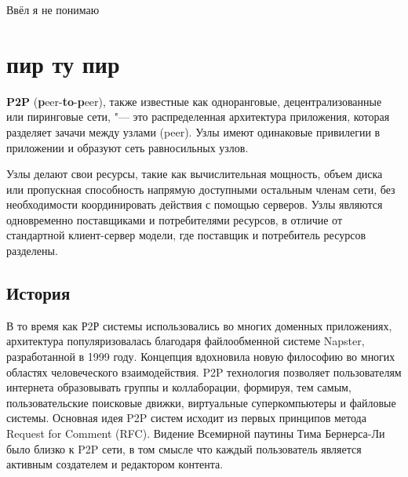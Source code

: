 \documentclass[bachelor, och, coursework]{SCWorks}
\begin{document}




\tableofcontents

\intro
Ввёл я не понимаю 

\section{пир ту пир}
\textbf{P2P} (\textbf{p}eer-\textbf{to}-\textbf{p}eer), также известные как одноранговые, децентрализованные или пиринговые сети, "--- это распределенная архитектура приложения, которая разделяет зачачи между узлами (peer). Узлы имеют одинаковые привилегии в приложении и образуют сеть равносильных узлов.

Узлы делают свои ресурсы, такие как вычислительная мощность, объем диска или пропускная способность напрямую доступными остальным членам сети, без необходимости координировать действия с помощью серверов. Узлы являются одновременно поставщиками и потребителями ресурсов, в отличие от стандартной клиент-сервер модели, где поставщик и потребитель ресурсов разделены.

\subsection{История}
В то время как Р2Р системы использовались во многих доменных приложениях, архитектура популяризовалась благодаря файлообменной системе Napster, разработанной в 1999 году. Концепция вдохновила новую философию во многих областях человеческого взаимодействия. P2P технология позволяет пользователям интернета образовывать группы и коллаборации, формируя, тем самым, пользовательские поисковые движки, виртуальные суперкомпьютеры и файловые системы. Основная идея P2P систем исходит из первых принципов метода Request for Comment (RFC). Видение Всемирной паутины Тима Бернерса-Ли было близко к P2P сети, в том смысле что каждый пользователь является активным создателем и редактором контента. 
\end{document}
